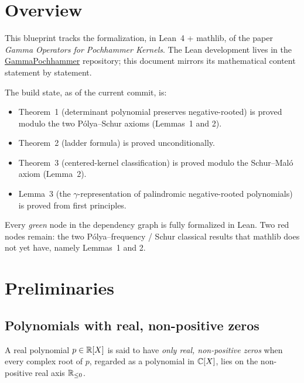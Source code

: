 
\chapter*{Overview}

This blueprint tracks the formalization, in Lean~4 + mathlib,
of the paper
\emph{Gamma Operators for Pochhammer Kernels}.
The Lean development lives in the
\href{https://github.com/rvazdev-ex/gamma-pochhammer}{GammaPochhammer}
repository; this document mirrors its mathematical content statement
by statement.

The build state, as of the current commit, is:

\begin{itemize}
  \item Theorem~1 (determinant polynomial preserves negative-rooted) is
        proved modulo the two Pólya--Schur axioms (Lemmas~1 and 2).
  \item Theorem~2 (ladder formula) is proved unconditionally.
  \item Theorem~3 (centered-kernel classification) is proved modulo
        the Schur--Maló axiom (Lemma~2).
  \item Lemma~3 (the $\gamma$-representation of palindromic
        negative-rooted polynomials) is proved from first principles.
\end{itemize}

Every \emph{green} node in the dependency graph is fully formalized in
Lean.  Two red nodes remain: the two Pólya--frequency / Schur
classical results that mathlib does not yet have, namely Lemmas~1 and 2.

\chapter{Preliminaries}
\label{ch:preliminaries}

\section{Polynomials with real, non-positive zeros}

\begin{definition}
  \label{def:HasOnlyRealNonposZeros}
  \leanok
  A real polynomial $p \in \mathbb{R}[X]$ is said to have \emph{only real,
  non-positive zeros} when every complex root of $p$, regarded as a
  polynomial in $\mathbb{C}[X]$, lies on the non-positive real axis
  $\mathbb{R}_{\leq 0}$.
\end{definition}

